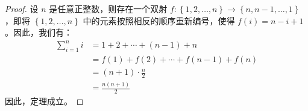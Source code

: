 \begin{proof}
  设 $n$ 是任意正整数，则存在一个双射 $f: \left\{1,2,\dots,n\right\} \rightarrow \left\{n,n-1,\dots,1\right\}$，即将 $\left\{1,2,\dots,n\right\}$ 中的元素按照相反的顺序重新编号，使得 $f(i) = n-i+1$。因此，我们有：
  \begin{align*}
    \sum_{i=1}^n i & = 1 + 2 + \cdots + (n-1) + n           \\
                   & = f(1) + f(2) + \cdots + f(n-1) + f(n) \\
                   & = (n+1) \cdot \frac{n}{2}              \\
                   & = \frac{n(n+1)}{2}
  \end{align*}
  因此，定理成立。
\end{proof}
